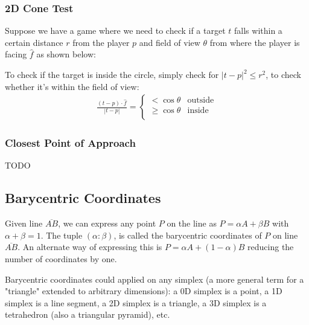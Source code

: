 \documentclass[12pt]{report}
\newcommand\pgfmathsinandcos[3]{%
	  \pgfmathsetmacro#1{sin(#3)}%
	  \pgfmathsetmacro#2{cos(#3)}%
	}
\begin{document}
\subsubsection{2D Cone Test}
Suppose we have a game where we need to check if a target $t$ falls within a certain distance $r$ from the player $p$ and field of view $\theta$ from where the player is facing $\hat{f}$ as shown below:
\begin{center}
\end{center}
To check if the target is inside the circle, simply check for $|t - p|^2 \leq r^2$, to check whether it's within the field of view:
\begin{align}
	\frac{(t - p) \cdot \hat{f}}{|t - p|} = \begin{cases}
	< \cos\theta    & \text{outside} \\
	\geq \cos\theta & \text{inside}  \\
	\end{cases}
\end{align}
		
\subsubsection{Closest Point of Approach}
TODO
\subsection{Barycentric Coordinates}
Given line $\overline{AB}$, we can express any point $P$ on the line as $P = \alpha A + \beta B$ with $\alpha + \beta = 1$. The tuple $(\alpha : \beta)$, is called the barycentric coordinates of $P$ on line $\overline{AB}$. An alternate way of expressing this is $P = \alpha A + (1 - \alpha) B$ reducing the number of coordinates by one.
		
Barycentric coordinates could applied on any simplex (a more general term for a "triangle" extended to arbitrary dimensions): a 0D simplex is a point, a 1D simplex is a line segment, a 2D simplex is a triangle, a 3D simplex is a tetrahedron (also a triangular pyramid), etc.
		
\end{document}
